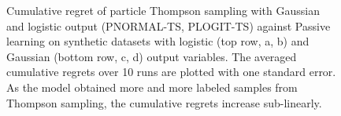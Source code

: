 
\begin{figure}[t]
	\centering
	\caption{\label{fig:synthetic} Cumulative regret of particle Thompson sampling with Gaussian and logistic output (PNORMAL-TS, PLOGIT-TS) against Passive learning 
	on synthetic datasets with logistic	(top row, a, b) and Gaussian (bottom row, c, d) output variables.
	The averaged cumulative regrets over 10 runs are plotted with one standard error. 
	As the model obtained more and more labeled samples from Thompson sampling, 
	the cumulative regrets increase sub-linearly.}
\end{figure}

